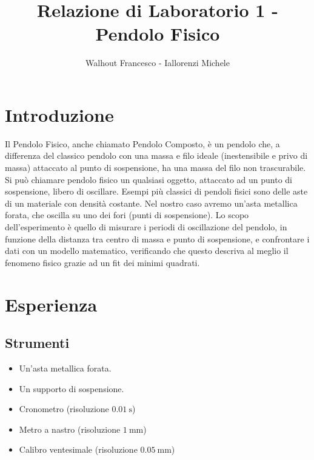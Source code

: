 \documentclass[a4paper]{article}
\title{Relazione di Laboratorio 1 - Pendolo Fisico}
\author{Walhout Francesco - Iallorenzi Michele}
\begin{document}
    \maketitle
    
    \section{Introduzione}
    Il Pendolo Fisico, anche chiamato Pendolo Composto, è un pendolo che, a differenza del classico pendolo con una massa e filo ideale (inestensibile e privo di massa) attaccato al punto di sospensione, ha una massa del filo non trascurabile. Si può chiamare pendolo fisico un qualsiasi oggetto, attaccato ad un punto di sospensione, libero di oscillare. Esempi più classici di pendoli fisici sono delle aste di un materiale con densità costante. Nel nostro caso avremo un'asta metallica forata, che oscilla su uno dei fori (punti di sospensione). Lo scopo dell'esperimento è quello di misurare i periodi di oscillazione del pendolo, in funzione della distanza tra centro di massa e punto di sospensione, e confrontare i dati con un modello matematico, verificando che questo descriva al meglio il fenomeno fisico grazie ad un fit dei minimi quadrati.
    
    \section{Esperienza}
    
    \subsection{Strumenti}
    \begin{itemize}
        \item Un'asta metallica forata.
        \item Un supporto di sospensione.
        \item Cronometro (risoluzione $\SI{0.01}{\s}$)
        \item Metro a nastro (risoluzione $\SI{1}{\mm}$)
        \item Calibro ventesimale (risoluzione $\SI{0.05}{\mm}$)
    \end{itemize}
    
\end{document}
